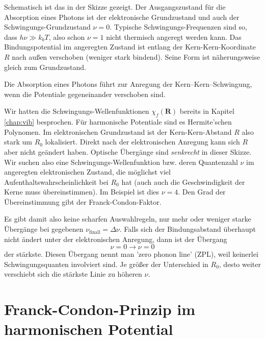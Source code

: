 Schematisch ist das in der Skizze gezeigt. Der Ausgangszustand für die Absorption eines Photons ist der elektronische Grundzustand und auch der Schwingungs-Grundzustand $\nu = 0$. Typische Schwingungs-Frequenzen sind so, dass $h \nu \gg k_b T$, also schon $\nu =1$ nicht thermisch angeregt werden kann. Das Bindungspotential im angeregten Zustand ist entlang der Kern-Kern-Koordinate $R$ nach außen verschoben (weniger stark bindend). Seine Form ist näherungsweise gleich zum Grundzustand. 

\begin{marginfigure}
\caption{Die Absorption eines Photons führt zur Anregung der Kern--Kern--Schwingung, wenn die Potentiale gegeneinander verschoben sind.}
\end{marginfigure}

Wir hatten die Schwingungs-Wellenfunktionen $\chi_f(\mathbf{R})$ bereits in Kapitel \ref{chap:vib} besprochen. Für harmonische Potentiale sind es Hermite'schen Polynomen. Im elektronischen Grundzustand ist der Kern-Kern-Abstand $R$ also stark um $R_0$ lokalisiert. Direkt nach der elektronischen Anregung kann sich $R$ aber nicht geändert haben. Optische Übergänge sind \emph{senkrecht} in dieser Skizze. Wir suchen also eine Schwingungs-Wellenfunktion bzw. deren Quantenzahl $\nu$ im angeregten elektronischen Zustand, die möglichst viel Aufenthaltswahrscheinlichkeit bei $R_0$ hat (auch auch die Geschwindigkeit der Kerne muss übereinstimmen). Im Beispiel ist dies $\nu = 4$. Den Grad der Übereinstimmung gibt der Franck-Condon-Faktor.

Es gibt damit also keine scharfen Auswahlregeln, nur mehr oder weniger starke Übergänge bei gegebenen $\nu_\text{finall}  = \Delta \nu$. Falls sich der Bindungsabstand überhaupt nicht ändert unter der elektronischen Anregung, dann ist der Übergang
\begin{equation}
 \nu = 0 \rightarrow \nu = 0
\end{equation}
der stärkste. Diesen Übergang nennt man 'zero phonon line' (ZPL), weil keinerlei Schwingungsquanten involviert sind. Je größer der Unterschied in $R_0$, desto weiter verschiebt sich die stärkste Linie zu höheren $\nu$. 



\section{Franck-Condon-Prinzip im harmonischen Potential}

